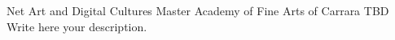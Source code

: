 \documentclass[11pt]{strongalecv}
\begin{document}
\begin{SideBar}{\ColorBackground}{\ColorTextSide}





        \vspace*{1cm}
        \Experience
        {\ColorHighlight}
		{Net Art and Digital Cultures Master}
		{Academy of Fine Arts of Carrara}
        {TBD}
        {   
            Write here your description.\\
            \lorem
        }
    \end{SideBar}

    

\end{document}
